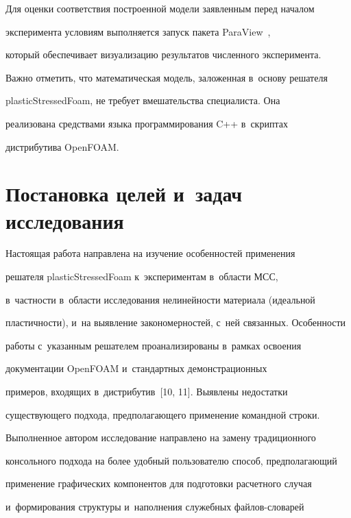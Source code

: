    


   Для оценки соответствия построенной модели заявленным перед началом 


эксперимента условиям выполняется запуск пакета ParaView~\cite{9-chi}, 


который обеспечивает визуализацию результатов численного эксперимента. 


Важно отметить, что математическая модель, заложенная в~основу решателя 


\mbox{plasticStressedFoam}, не требует вмешательства специалиста. Она 


реализована средствами языка программирования C++ в~скриптах 


дистрибутива \mbox{OpenFOAM}.


   


\section{Постановка целей и~задач исследования}





   Настоящая работа направлена на изучение особенностей применения 


решателя \mbox{plasticStressedFoam} к~экспериментам в~об\-ласти МСС, 


в~част\-ности в~об\-ласти исследования нелинейности материала (идеальной 


пластичности), и~на выявление закономерностей, с~ней связанных. Особенности 


работы с~указанным решателем проанализированы в~рамках освоения 


документации \mbox{OpenFOAM} и~стандартных демонстрационных 


примеров, входящих в~дистрибутив~[10, 11]. Выявлены недостатки 


существующего подхода, пред\-по\-ла\-га\-юще\-го применение командной строки.


   


   Выполненное автором исследование на\-прав\-ле\-но на замену традиционного 


консольного подхода на более удобный пользователю способ, пред\-по\-ла\-га\-ющий 


применение графических компонентов для подготовки расчетного случая 


и~формирования структуры и~наполнения служебных фай\-лов-сло\-ва\-рей 


